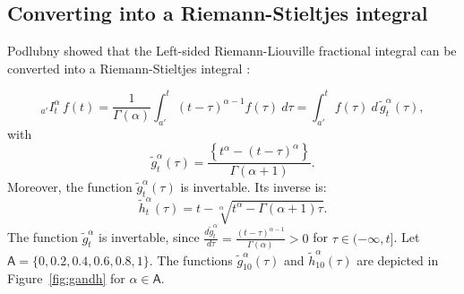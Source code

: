 \documentclass[twoside,reqno,11pt]{fcaa-var} %
\begin{document}
\subsection{Converting into a Riemann-Stieltjes integral}
Podlubny showed that the Left-sided Riemann-Liouville fractional integral can be converted into a Riemann-Stieltjes integral \cite{podlubny02}:

\begin{equation}
\label{eq:rl_to_rs}
_{a'}I_t^{\alpha}\,f(t) = \frac{1}{\Gamma(\alpha)}\int_{a'}^{t}(t-\tau)^{\alpha-1}f(\tau)~d\tau = \int_{a'}^{t} f(\tau)~d\,\widetilde{g}_t^{\alpha}(\tau), 
\end{equation}
with 
\begin{equation}
\label{eq:g_rl}
\widetilde{g}_t^{\alpha}(\tau) = \frac{\left \{t^{\alpha} - (t-\tau)^{\alpha} \right \}}{\Gamma(\alpha+1)}. 
\end{equation}
Moreover, the function $\widetilde{g}_t^{\alpha}(\tau)$ is invertable. Its inverse is:
\begin{equation}
\label{eq:h}
\widetilde{h}_t^{\alpha}(\tau) = t - \sqrt[\alpha]{t^{\alpha} - \Gamma(\alpha+1)\tau}.
\end{equation}
The function $\widetilde{g}_t^{\alpha}$ is invertable, since $\frac{d \widetilde{g}_t^{\alpha}}{d\tau}=\frac{(t-\tau)^{\alpha-1}}{\Gamma(\alpha)} > 0$ for $\tau\in(-\infty,t]$. Let $\mathsf{A} = \{0,0.2,0.4,0.6,0.8,1\}$. The functions $\widetilde{g}_{10}^{\alpha}(\tau)$ and $\widetilde{h}_{10}^{\alpha}(\tau)$ are depicted in Figure~\ref{fig:gandh} for $\alpha\in\mathsf{A}$.\\



\end{document}
